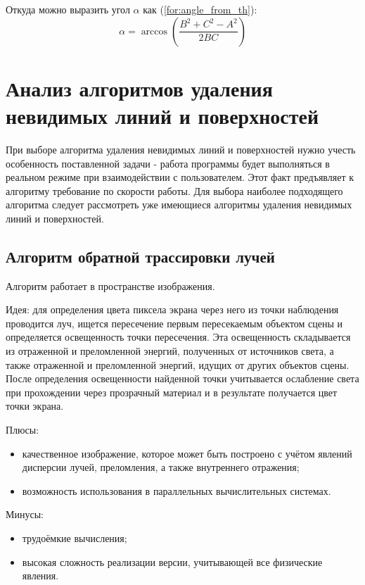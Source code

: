 Откуда можно выразить угол $\alpha$ как (\ref{for:angle_from_th}):
\begin{equation}
    \label{for:angle_from_th}
    \alpha = \arccos{\left(\frac{B^2 + C^2 - A^2}{2BC}\right)}
\end{equation}

\section{Анализ алгоритмов удаления невидимых линий и поверхностей}

При выборе алгоритма удаления невидимых линий и поверхностей нужно учесть особенность поставленной задачи - работа программы будет выполняться в реальном режиме при взаимодействии с пользователем. Этот факт предъявляет к алгоритму требование по скорости работы. Для выбора наиболее подходящего алгоритма следует рассмотреть уже имеющиеся алгоритмы удаления невидимых линий и поверхностей.

\subsection{Алгоритм обратной трассировки лучей}
Алгоритм работает в пространстве изображения.

Идея: для определения цвета пиксела экрана через него из точки наблюдения проводится луч, ищется пересечение первым пересекаемым объектом сцены и определяется освещенность точки пересечения. Эта освещенность складывается из отраженной и преломленной энергий, полученных от источников света, а также отраженной и преломленной энергий, идущих от других объектов сцены. После определения освещенности найденной точки учитывается ослабление света при прохождении через прозрачный материал и в результате получается цвет точки экрана.

Плюсы:
\begin{itemize}
    \item качественное изображение, которое может быть построено с учётом явлений дисперсии лучей, преломления, а также внутреннего отражения;
    \item возможность использования в параллельных вычислительных системах.
\end{itemize}

Минусы:
\begin{itemize}
    \item трудоёмкие вычисления;
    \item высокая сложность реализации версии, учитывающей все физические явления.
\end{itemize}


